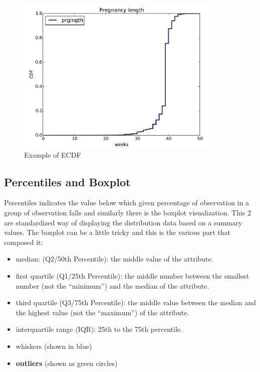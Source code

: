 \begin{figure}[H]
    \centering
    \includegraphics[scale=.80]{images/DataExplVis/ECDF.png}
    \caption{Example of ECDF}
    \label{fig:enter-label}
\end{figure}

\subsection{Percentiles and Boxplot}

Percentiles indicates the value below which given percentage of observation in a group of observation falls and similarly there is the boxplot visualization. This 2 are standardized way of displaying the distribution data based on a summary values.
The boxplot can be a little tricky and this is the various part that composed it:
\begin{itemize}
    \item median: (Q2/50th Percentile): the middle value of the attribute.
    \item first quartile (Q1/25th Percentile): the middle number between the smallest number (not the “minimum”) and the median of the attribute.
    \item third quartile (Q3/75th Percentile): the middle value between the median and the highest value (not the “maximum”) of the attribute.
    \item interquartile range (IQR): 25th to the 75th percentile.
    \item whiskers (shown in blue)
    \item \textbf{outliers} (shown as green circles)
\end{itemize}

